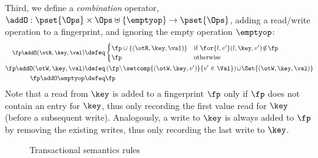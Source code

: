Third, we define a \emph{combination} operator,
$\addO  : \pset{\Ops} \times \Ops \uplus \{\emptyop\} \rightarrow \pset{\Ops}$, 
adding a read/write operation to a fingerprint, and ignoring the empty operation $\emptyop$: 
%
{
\begin{align*}
\small
    \fp \addO (\otR, \key, \val)  
    & \defeq
    \begin{cases}
        \fp \cup \{(\otR, \key, \val)\} & \text{if } \for{l, v'} (l, \key, v') \! \notin \! \fp \\
        \fp &  \text{otherwise} \\
    \end{cases}  \\
    \fp \addO (\otW, \key, \val) 
    & \defeq 
    \left( \fp \! \setminus \! \setcomp{(\otW, \key, v')}{v' \in \Val} \right)  \!
    \cup \! \Set{(\otW, \key, \val)} \\
    \fp \addO \emptyop  & \defeq \fp 
\end{align*}
}
%
Note that a read from $\key$ is added to a fingerprint $\fp$ only if $\fp$ does not contain an entry for $\key$, thus only recording the first value read for $\key$ (before a subsequent write). 
Analogously, a write to $\key$ is always added to $\fp$ by removing the existing writes, thus only recording the last write to $\key$. 

%
\begin{figure*}[!t]
\small
{}
\hrulefill

\caption{Transactional semantics rules}
\label{fig:semantics-trans}
\end{figure*}

